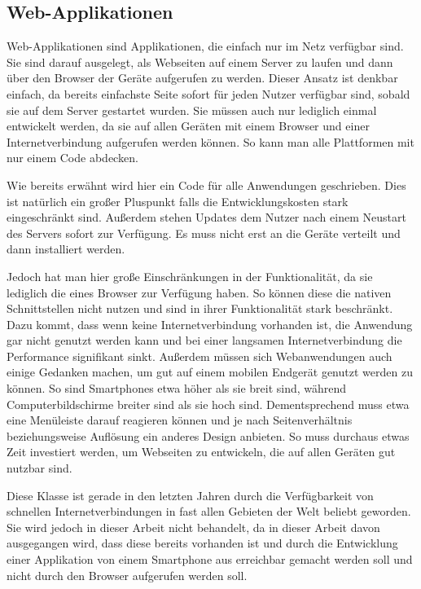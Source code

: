 \subsection{Web-Applikationen}
Web-Applikationen sind Applikationen, die einfach nur im Netz verfügbar sind. Sie sind darauf ausgelegt, als Webseiten auf einem Server zu laufen und dann über den Browser der Geräte aufgerufen zu werden. Dieser Ansatz ist denkbar einfach, da bereits einfachste Seite sofort für jeden Nutzer verfügbar sind, sobald sie auf dem Server gestartet wurden. Sie müssen auch nur lediglich einmal entwickelt werden, da sie auf allen Geräten mit einem Browser und einer Internetverbindung aufgerufen werden können. So kann man alle Plattformen mit nur einem Code abdecken.\cite{IEEE_development_classes}

Wie bereits erwähnt wird hier ein Code für alle Anwendungen geschrieben. Dies ist natürlich ein großer Pluspunkt falls die Entwicklungskosten stark eingeschränkt sind. Außerdem stehen Updates dem Nutzer nach einem Neustart des Servers sofort zur Verfügung. Es muss nicht erst an die Geräte verteilt und dann installiert werden.\cite{IEEE_Khackouch_Al}

Jedoch hat man hier große Einschränkungen in der Funktionalität, da sie lediglich die eines Browser zur Verfügung haben. So können diese die nativen Schnittstellen nicht nutzen und sind in ihrer Funktionalität stark beschränkt.\cite{Phyo} Dazu kommt, dass wenn keine Internetverbindung vorhanden ist, die Anwendung gar nicht genutzt werden kann und bei einer langsamen Internetverbindung die Performance signifikant sinkt.\cite{IEEE_Khackouch_Al} Außerdem müssen sich Webanwendungen auch einige Gedanken machen, um gut auf einem mobilen Endgerät genutzt werden zu können. So sind Smartphones etwa höher als sie breit sind, während Computerbildschirme breiter sind als sie hoch sind. Dementsprechend muss etwa eine Menüleiste darauf reagieren können und je nach Seitenverhältnis beziehungsweise Auflösung ein anderes Design anbieten. So muss durchaus etwas Zeit investiert werden, um Webseiten zu entwickeln, die auf allen Geräten gut nutzbar sind.

Diese Klasse ist gerade in den letzten Jahren durch die Verfügbarkeit von schnellen Internetverbindungen in fast allen Gebieten der Welt beliebt geworden. Sie wird jedoch in dieser Arbeit nicht behandelt, da in dieser Arbeit davon ausgegangen wird, dass diese bereits vorhanden ist und durch die Entwicklung einer Applikation von einem Smartphone aus erreichbar gemacht werden soll und nicht durch den Browser aufgerufen werden soll. 

